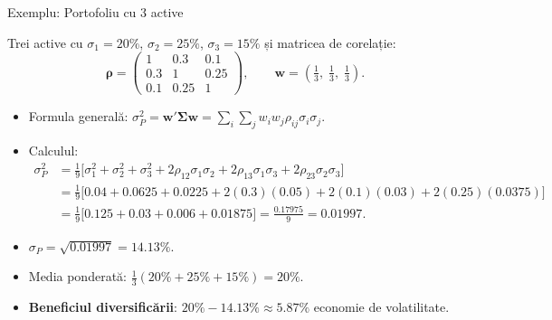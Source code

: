\documentclass[9pt, aspectratio=169, t]{beamer}
\theoremstyle{definition}
\begin{document}
\begin{frame}{Exemplu: Portofoliu cu 3 active}
\begin{example}
Trei active cu $\sigma_1 = 20\%$, $\sigma_2 = 25\%$, $\sigma_3 = 15\%$ și matricea de corelație:
\[
\boldsymbol{\rho} = \begin{pmatrix} 1 & 0.3 & 0.1 \\ 0.3 & 1 & 0.25 \\ 0.1 & 0.25 & 1 \end{pmatrix}, \qquad \mathbf{w} = \left(\tfrac{1}{3},\;\tfrac{1}{3},\;\tfrac{1}{3}\right).
\]
\end{example}
\vspace{0.1cm}
\begin{itemize}\small\setlength{\itemsep}{1pt}
    \item Formula generală: $\sigma_P^2 = \mathbf{w}'\boldsymbol{\Sigma}\mathbf{w} = \sum_{i}\sum_{j} w_i w_j \rho_{ij}\sigma_i\sigma_j$.
    \item Calculul:
    {\footnotesize
    \begin{align*}
    \sigma_P^2 &= \tfrac{1}{9}\bigl[\sigma_1^2 + \sigma_2^2 + \sigma_3^2 + 2\rho_{12}\sigma_1\sigma_2 + 2\rho_{13}\sigma_1\sigma_3 + 2\rho_{23}\sigma_2\sigma_3\bigr] \\
    &= \tfrac{1}{9}\bigl[0.04 + 0.0625 + 0.0225 + 2(0.3)(0.05) + 2(0.1)(0.03) + 2(0.25)(0.0375)\bigr] \\
    &= \tfrac{1}{9}\bigl[0.125 + 0.03 + 0.006 + 0.01875\bigr] = \tfrac{0.17975}{9} = 0.01997.
    \end{align*}}
    \item $\sigma_P = \sqrt{0.01997} = 14.13\%$.
    \item Media ponderată: $\tfrac{1}{3}(20\% + 25\% + 15\%) = 20\%$.
    \item \textbf{Beneficiul diversificării}: $20\% - 14.13\% \approx 5.87\%$ economie de volatilitate.
\end{itemize}
\end{frame}
\end{document}
